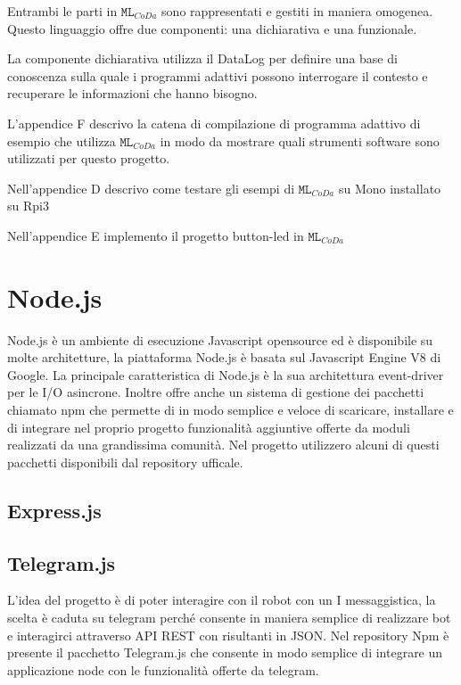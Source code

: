 Entrambi le parti in $ \texttt{ML}_{CoDa} $ sono rappresentati e gestiti in maniera omogenea. Questo linguaggio offre due componenti: una dichiarativa e una funzionale.

La componente dichiarativa  utilizza il DataLog per definire una base di conoscenza sulla quale i programmi adattivi possono interrogare il contesto e recuperare le informazioni che hanno bisogno.


L'appendice F descrivo la catena di compilazione di programma adattivo di esempio che utilizza $ \texttt{ML}_{CoDa} $ in modo da mostrare quali strumenti software sono utilizzati per questo progetto.


 
Nell'appendice D descrivo come testare gli esempi di $ \texttt{ML}_{CoDa} $ su Mono installato su Rpi3
 
Nell'appendice E implemento il progetto button-led in $ \texttt{ML}_{CoDa} $

\section{Node.js}

Node.js è un ambiente di esecuzione Javascript  opensource ed è disponibile su molte architetture, la piattaforma Node.js è basata sul Javascript Engine V8 di Google.
La principale caratteristica di Node.js è la sua  architettura event-driver per le I/O asincrone.
Inoltre offre anche un sistema di gestione dei pacchetti chiamato npm che permette di  in modo semplice e veloce di scaricare, installare e di integrare nel proprio progetto funzionalità aggiuntive offerte da moduli realizzati da una grandissima comunità.
Nel progetto utilizzero alcuni di questi pacchetti disponibili dal repository ufficale.


\subsection{Express.js}

\subsection{Telegram.js}
L’idea del progetto è di poter interagire con il robot con un I messaggistica, la scelta è caduta su telegram perché consente in maniera semplice di realizzare bot e interagirci attraverso API REST con risultanti in JSON. Nel repository Npm è presente il pacchetto Telegram.js che consente in modo semplice di integrare un applicazione node con le funzionalità offerte da telegram.

